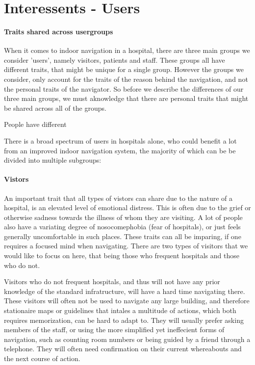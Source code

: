 \section{Interessents - Users} %
\label{sec:interusers}


\paragraph{Traits shared across usergroups}

When it comes to indoor navigation in a hospital, there are three main groups we consider 'users', namely visitors, patients and staff. These groups all have different traits, that might be unique for a single group. However the groups we consider, only account for the traits of the reason behind the navigation, and not the personal traits of the navigator. So before we describe the differences of our three main groups, we must aknowledge that there are personal traits that might be shared across all of the groups.

People have different




There is a broad spectrum of users in hospitals alone, who could benefit a lot from an improved indoor navigation system, the majority of which can be be divided into multiple subgroups:

\paragraph{Vistors} %
 \label{par:vistors}
 

An important trait that all types of vistors can share due to the nature of a hospital, is an elevated level of emotional distress. This is often due to the grief or otherwise sadness towards the illness of whom they are visiting. A lot of people also have a variating degree of nosocomephobia (fear of hospitals), or just feels generally uncomfortable in such places. These traits can all be imparing, if one requires a focused mind when navigating. There are two types of visitors that we would like to focus on here, that being those who frequent hospitals and those who do not.

Visitors who do not frequent hospitals, and thus will not have any prior knowledge of the standard infratructure, will have a hard time navigating there. These visitors will often not be used to navigate any large building, and therefore stationaire maps or guidelines that intales a multitude of actions, which both requires memorization, can be hard to adapt to. They will usually prefer asking members of the staff, or using the more simplified yet ineffecient forms of navigation, such as counting room numbers or being guided by a friend through a telephone. They will often need confirmation on their current whereabouts and the next course of action.

